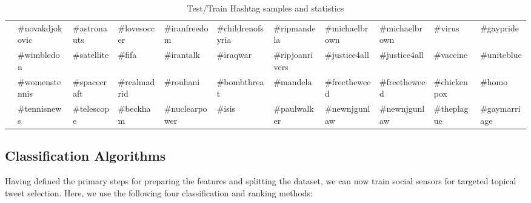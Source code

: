 \begin{table*}[tbh!]
{{\begin{tabular}{|l|l|l|l|l|l|l|l|l|l|l|}
                                          & \#novakdjokovic                      & \#astronauts                        & \#lovesoccer                         & \#iranfreedom                          & \#childrenofsyria                           & \#ripmandela                                 & \#michaelbrown                             & \#michaelbrown                                & \#virus                                 & \#gaypride                         \\ \cline{2-11} 
                                          & \#wimbledon                          & \#satellite                         & \#fifa                               & \#irantalk                             & \#iraqwar                                   & \#ripjoanrivers                              & \#justice4all                              & \#justice4all                                 & \#vaccine                               & \#uniteblue                        \\ \cline{2-11} 
                                          & \#womenstennis                       & \#spacecraft                        & \#realmadrid                         & \#rouhani                              & \#bombthreat                                & \#mandela                                    & \#freetheweed                              & \#freetheweed                                 & \#chickenpox                            & \#homo                             \\ \cline{2-11} 
                                          & \#tennisnews                         & \#telescope                         & \#beckham                            & \#nuclearpower                         & \#isis                                      & \#paulwalker                                 & \#newnjgunlaw                              & \#newnjgunlaw                                 & \#theplague                             & \#gaymarriage                      \\ \hline
\end{tabular}
}
}
\caption{Test/Train Hashtag samples and statistics}
\label{table:sampleHashtags}
\end{table*}

\subsection{Classification Algorithms}
Having defined the primary steps for preparing the features and splitting the dataset, we can now train social sensors for targeted topical tweet selection. Here, we use the following four classification and ranking methods: %

